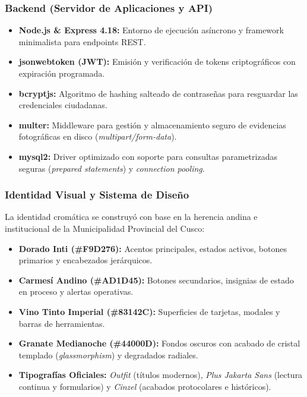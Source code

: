 \documentclass[12pt,a4paper]{article}
\begin{document}
\subsubsection{Backend (Servidor de Aplicaciones y API)}
\begin{itemize}[leftmargin=*]
    \item \textbf{Node.js \& Express 4.18:} Entorno de ejecución asíncrono y framework minimalista para endpoints REST.
    \item \textbf{jsonwebtoken (JWT):} Emisión y verificación de tokens criptográficos con expiración programada.
    \item \textbf{bcryptjs:} Algoritmo de hashing salteado de contraseñas para resguardar las credenciales ciudadanas.
    \item \textbf{multer:} Middleware para gestión y almacenamiento seguro de evidencias fotográficas en disco (\textit{multipart/form-data}).
    \item \textbf{mysql2:} Driver optimizado con soporte para consultas parametrizadas seguras (\textit{prepared statements}) y \textit{connection pooling}.
\end{itemize}

\subsubsection{Identidad Visual y Sistema de Diseño}
La identidad cromática se construyó con base en la herencia andina e institucional de la Municipalidad Provincial del Cusco:
\begin{itemize}[leftmargin=*]
    \item \textbf{Dorado Inti (\#F9D276):} Acentos principales, estados activos, botones primarios y encabezados jerárquicos.
    \item \textbf{Carmesí Andino (\#AD1D45):} Botones secundarios, insignias de estado en proceso y alertas operativas.
    \item \textbf{Vino Tinto Imperial (\#83142C):} Superficies de tarjetas, modales y barras de herramientas.
    \item \textbf{Granate Medianoche (\#44000D):} Fondos oscuros con acabado de cristal templado (\textit{glassmorphism}) y degradados radiales.
    \item \textbf{Tipografías Oficiales:} \textit{Outfit} (títulos modernos), \textit{Plus Jakarta Sans} (lectura continua y formularios) y \textit{Cinzel} (acabados protocolares e históricos).
\end{itemize}
\end{document}
